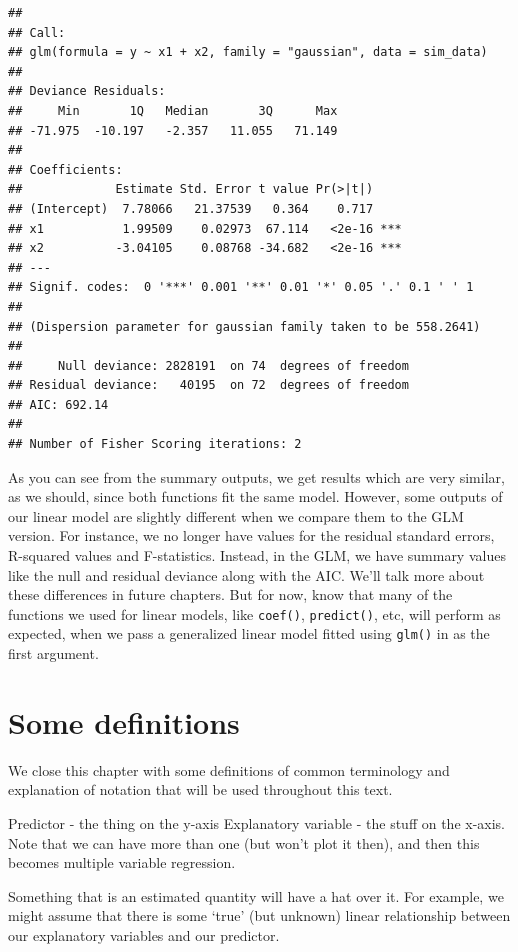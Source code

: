 \documentclass[
]{book}
\begin{document}
\begin{verbatim}
## 
## Call:
## glm(formula = y ~ x1 + x2, family = "gaussian", data = sim_data)
## 
## Deviance Residuals: 
##     Min       1Q   Median       3Q      Max  
## -71.975  -10.197   -2.357   11.055   71.149  
## 
## Coefficients:
##             Estimate Std. Error t value Pr(>|t|)    
## (Intercept)  7.78066   21.37539   0.364    0.717    
## x1           1.99509    0.02973  67.114   <2e-16 ***
## x2          -3.04105    0.08768 -34.682   <2e-16 ***
## ---
## Signif. codes:  0 '***' 0.001 '**' 0.01 '*' 0.05 '.' 0.1 ' ' 1
## 
## (Dispersion parameter for gaussian family taken to be 558.2641)
## 
##     Null deviance: 2828191  on 74  degrees of freedom
## Residual deviance:   40195  on 72  degrees of freedom
## AIC: 692.14
## 
## Number of Fisher Scoring iterations: 2
\end{verbatim}

As you can see from the summary outputs, we get results which are very similar, as we should, since both functions fit the same model. However, some outputs of our linear model are slightly different when we compare them to the GLM version. For instance, we no longer have values for the residual standard errors, R-squared values and F-statistics. Instead, in the GLM, we have summary values like the null and residual deviance along with the AIC. We'll talk more about these differences in future chapters. But for now, know that many of the functions we used for linear models, like \texttt{coef()}, \texttt{predict()}, etc, will perform as expected, when we pass a generalized linear model fitted using \texttt{glm()} in as the first argument.

\hypertarget{definitions}{%
\section{Some definitions}\label{definitions}}

We close this chapter with some definitions of common terminology and explanation of notation that will be used throughout this text.

Predictor - the thing on the y-axis
Explanatory variable - the stuff on the x-axis. Note that we can have more than one (but won't plot it then), and then this becomes multiple variable regression.

Something that is an estimated quantity will have a hat over it.
For example, we might assume that there is some `true' (but unknown) linear relationship between our explanatory variables and our predictor.
\end{document}
